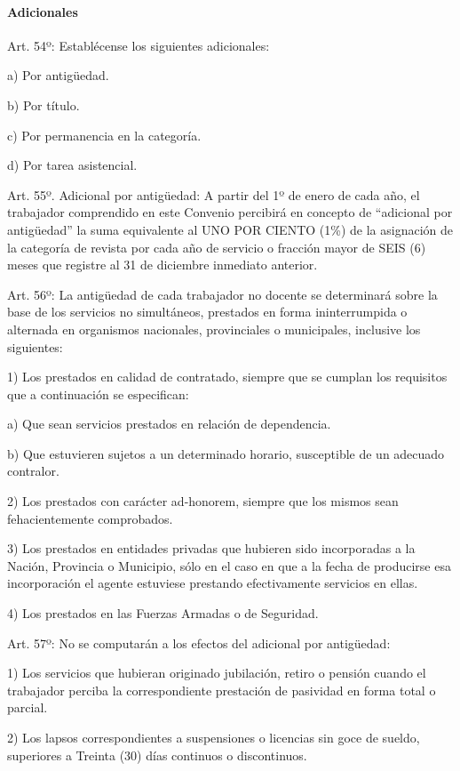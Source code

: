 \documentclass[]{article}
\let\oldparagraph\paragraph
\renewcommand{\paragraph}[1]{\oldparagraph{#1}\mbox{}}
\begin{document}
\paragraph{Adicionales}\label{adicionales}

Art. 54º: Establécense los siguientes adicionales:

a) Por antigüedad.

b) Por título.

c) Por permanencia en la categoría.

d) Por tarea asistencial.

Art. 55º. Adicional por antigüedad: A partir del 1º de enero de cada
año, el trabajador comprendido en este Convenio percibirá en concepto de
``adicional por antigüedad'' la suma equivalente al UNO POR CIENTO (1\%)
de la asignación de la categoría de revista por cada año de servicio o
fracción mayor de SEIS (6) meses que registre al 31 de diciembre
inmediato anterior.

Art. 56º: La antigüedad de cada trabajador no docente se determinará
sobre la base de los servicios no simultáneos, prestados en forma
ininterrumpida o alternada en organismos nacionales, provinciales o
municipales, inclusive los siguientes:

1) Los prestados en calidad de contratado, siempre que se cumplan los
requisitos que a continuación se especifican:

a) Que sean servicios prestados en relación de dependencia.

b) Que estuvieren sujetos a un determinado horario, susceptible de un
adecuado contralor.

2) Los prestados con carácter ad-honorem, siempre que los mismos sean
fehacientemente comprobados.

3) Los prestados en entidades privadas que hubieren sido incorporadas a
la Nación, Provincia o Municipio, sólo en el caso en que a la fecha de
producirse esa incorporación el agente estuviese prestando efectivamente
servicios en ellas.

4) Los prestados en las Fuerzas Armadas o de Seguridad.

Art. 57º: No se computarán a los efectos del adicional por antigüedad:

1) Los servicios que hubieran originado jubilación, retiro o pensión
cuando el trabajador perciba la correspondiente prestación de pasividad
en forma total o parcial.

2) Los lapsos correspondientes a suspensiones o licencias sin goce de
sueldo, superiores a Treinta (30) días continuos o discontinuos.
\end{document}
